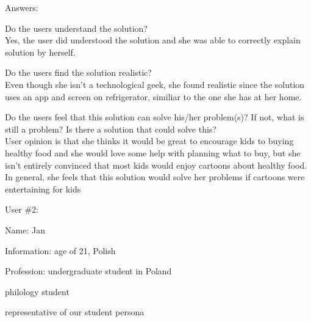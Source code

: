 \documentclass[a4paper,10pt,oneside]{scrreprt}
\begin{document}
Answers:
\begin{compactitem}
	\item Do the users understand the solution?\\
		Yes, the user did understood the solution and she was able to correctly explain solution by herself.\\
	
	\item Do the users find the solution realistic?\\
		Even though she isn't a technological geek, she found realistic since the solution uses an app and screen on refrigerator, similiar to the one she has at her home.\\
		
	\item Do the users feel that this solution can solve his/her problem(s)? If not, what is still
	a problem? Is there a solution that could solve this?\\
		User opinion is that she thinks it would be great to encourage kids to buying healthy food and she would love some help with planning what to buy, 
but she isn't entirely convinced that most kids would enjoy cartoons about healthy food. In general, she feels that this solution would solve her problems
if cartoons were entertaining for kids

\end{compactitem}
\bigskip
\bigskip
User \#2:
\begin{compactitem}
	\item Name: Jan
	\item Information: age of 21, Polish
	\item Profession: undergraduate student in Poland
	\item philology student
	\item representative of our student persona 
\end{compactitem}
\bigskip
\end{document}
